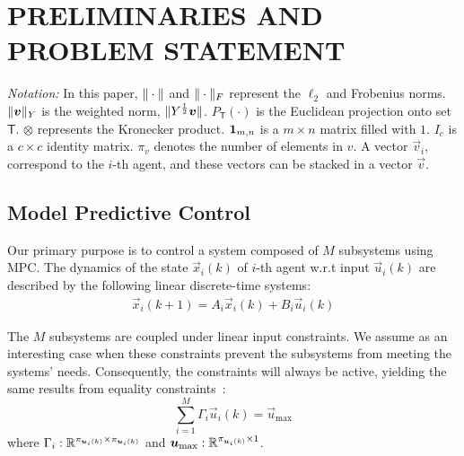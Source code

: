 \documentclass[a4paper, 10 pt, conference]{ieeeconf}  %
\begin{document}
\section{PRELIMINARIES AND PROBLEM STATEMENT}\label{sec:PS}
\emph{Notation:} In this paper, $\|\cdot\|$ and $\|\cdot\|_{F}$ represent the $\ell_{2}$ and Frobenius norms. $\|\bm{v}\|_{Y}$ is the weighted norm, $\|Y^{\frac{1}{2}}\bm{v}\|$.
$P_{\mathsf{T}}(\cdot)$ is the Euclidean projection onto set $\mathsf{T}$.
$\otimes$ represents the Kronecker product. $\mathbf{1}_{m,n}$ is a ${m\times n}$ matrix filled with $1$.
$I_{c}$ is a ${c\times c}$ identity matrix.
$\pi_{v}$ denotes the number of elements in $v$.
A vector $\vec{v}_{i}$, correspond to the $i$-th agent, and these vectors can be stacked in a vector $\vec{v}$.

\subsection{Model Predictive Control}\label{ssec:MPC}
Our primary purpose is to control a system composed of $M$ subsystems using MPC\@.
The dynamics of the state ${\vec{x}_{i}(k)}$ of $i$-th agent w.r.t
input ${\vec{u}_{i}(k)}$ are described by the following linear discrete-time systems:
\begin{equation}
\begin{matrix}
  \label{eq:systems}
\vec{x}_{i}(k+1)=A_{i}\vec{x}_{i}(k) + B_{i}\vec{u}_{i}(k)
\end{matrix}
\end{equation}


The $M$ subsystems are coupled under linear input constraints.
We assume as an interesting case when these constraints prevent the subsystems from meeting the systems' needs. Consequently, the constraints will always be active, yielding the same results from equality constraints~\cite{BoydVandenberghe2004}:
\begin{equation}
  \label{eq:constraint}
  \sum^{M}_{i=1}\Gamma_{i}\vec{u}_{i}(k)=\vec{u}_{\mathrm{\max}}
\end{equation}
where $\Gamma_{i}:\mathbb{R}^{\pi_{\bm{u}_{i}(k)}\times \pi_{\bm{u}_{i}(k)}}$ and $\bm{u}_{\mathrm{\max}}:\mathbb{R}^{\pi_{\bm{u}_{i}(k)}\times 1}$.
\end{document}
